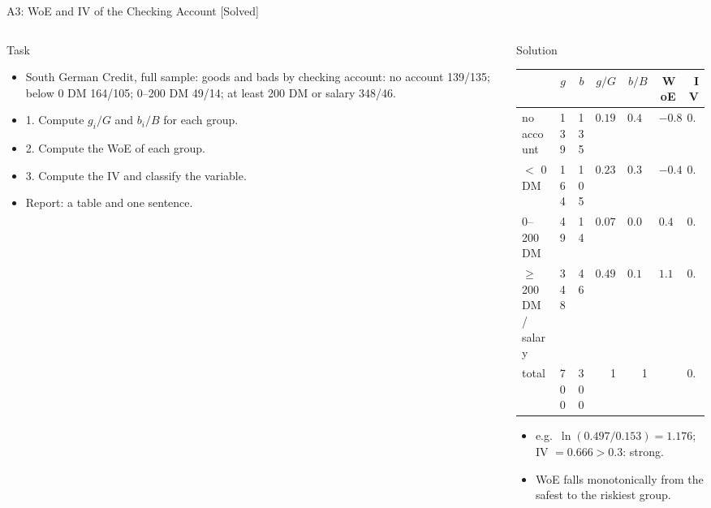 \begin{frame}{A3: WoE and IV of the Checking Account [Solved]}
\itemsize{\scriptsize}
\begin{columns}[T]
\begin{column}{0.47\textwidth}
\begin{block}{Task}
\begin{itemize}
    \item South German Credit, full sample: goods and bads by checking account: no account 139/135; below 0 DM 164/105; 0--200 DM 49/14; at least 200 DM or salary 348/46.
    \item 1. Compute $g_i/G$ and $b_i/B$ for each group.
    \item 2. Compute the WoE of each group.
    \item 3. Compute the IV and classify the variable.
    \item Report: a table and one sentence.
\end{itemize}
\end{block}
\end{column}
\begin{column}{0.49\textwidth}
\begin{exampleblock}{Solution}
\begin{center}
\tiny
\begin{tabular}{lrrrrrr}
\toprule
& $g$ & $b$ & $g/G$ & $b/B$ & WoE & IV \\
\midrule
no account & 139 & 135 & $0.199$ & $0.450$ & $-0.818$ & $0.206$ \\
$<$ 0 DM & 164 & 105 & $0.234$ & $0.350$ & $-0.401$ & $0.046$ \\
0--200 DM & 49 & 14 & $0.070$ & $0.047$ & $0.405$ & $0.009$ \\
$\ge$ 200 DM / salary & 348 & 46 & $0.497$ & $0.153$ & $1.176$ & $0.404$ \\
total & 700 & 300 & 1 & 1 & & $0.666$ \\
\bottomrule
\end{tabular}
\end{center}
\begin{itemize}
    \item e.g.\ $\ln(0.497/0.153) = 1.176$; IV $= 0.666 > 0.3$: strong.
    \item WoE falls monotonically from the safest to the riskiest group.
\end{itemize}
\end{exampleblock}
\end{column}
\end{columns}
\end{frame}

